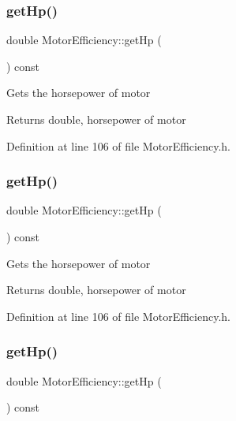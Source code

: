 \subsubsection{\texorpdfstring{get\+Hp()}{getHp()}\hspace{0.1cm}{\footnotesize\ttfamily [1/3]}}
{\footnotesize\ttfamily double Motor\+Efficiency\+::get\+Hp (\begin{DoxyParamCaption}{ }\end{DoxyParamCaption}) const\hspace{0.3cm}{\ttfamily [inline]}}

Gets the horsepower of motor \begin{DoxyReturn}{Returns}
double, horsepower of motor 
\end{DoxyReturn}


Definition at line 106 of file Motor\+Efficiency.\+h.

\mbox{\label{class_motor_efficiency_a9f88159c82daa270975d7969debe88a9}} 
\subsubsection{\texorpdfstring{get\+Hp()}{getHp()}\hspace{0.1cm}{\footnotesize\ttfamily [2/3]}}
{\footnotesize\ttfamily double Motor\+Efficiency\+::get\+Hp (\begin{DoxyParamCaption}{ }\end{DoxyParamCaption}) const\hspace{0.3cm}{\ttfamily [inline]}}

Gets the horsepower of motor \begin{DoxyReturn}{Returns}
double, horsepower of motor 
\end{DoxyReturn}


Definition at line 106 of file Motor\+Efficiency.\+h.

\mbox{\label{class_motor_efficiency_a9f88159c82daa270975d7969debe88a9}} 
\subsubsection{\texorpdfstring{get\+Hp()}{getHp()}\hspace{0.1cm}{\footnotesize\ttfamily [3/3]}}
{\footnotesize\ttfamily double Motor\+Efficiency\+::get\+Hp (\begin{DoxyParamCaption}{ }\end{DoxyParamCaption}) const\hspace{0.3cm}{\ttfamily [inline]}}

